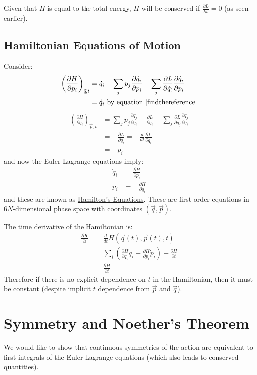 \documentclass[../Main.tex]{subfiles}
\begin{document}
Given that $H$ is equal to the total energy, $H$ will be conserved if $\frac{\partial L}{\partial t} = 0$ (as seen earlier).
\subsection{Hamiltonian Equations of Motion}
Consider:
\begin{align*}
    \left(\frac{\partial H}{\partial p_i}\right)_{\vec{q}, t} &= \dot{q}_i + \sum_j p_j \frac{\partial \dot{q}_i}{\partial p_i} - \sum_j \frac{\partial L}{\partial \dot{q}_i} \frac{\partial \dot{q}_i}{\partial p_i} \\
    &= \dot{q}_i \text{ by equation~\ref{findthereference}}
\end{align*}
\begin{align*}
    \left(\frac{\partial H}{\partial q_i}\right)_{\vec{p}, t} &= \sum_j p_j \frac{\partial \dot{q}_j}{\partial q_i} - \frac{\partial L}{\partial q_i} - \sum_j \frac{\partial L}{\partial \dot{q}_j} \frac{\partial \dot{q_j}}{\partial q_i} \\
    &= -\frac{\partial L}{\partial q_i} = -\frac{d}{dt} \frac{\partial L}{\partial q_i} \\
    &= -\dot{p}_i
\end{align*}
and now the Euler-Lagrange equations imply:
\begin{align}
    \dot{q}_i &= \frac{\partial H}{\partial p_i} \label{eqnHamilton1} \\
    \dot{p}_i &= -\frac{\partial H}{\partial q_i} \label{eqnHamilton2}
\end{align}
and these are known as \underline{Hamilton's Equations}. These are first-order equations in $6N$-dimensional phase space with coordinates $(\vec{q}, \vec{p})$.


The time derivative of the Hamiltonian is:
\begin{align*}
    \frac{\partial H}{\partial t} &= \frac{d}{dt} H(\vec{q}(t), \vec{p}(t), t) \\
    &= \sum_i \left(\frac{\partial H}{\partial q_i} \dot{q}_i + \frac{\partial H}{\partial p_i} \dot{p}_i\right) + \frac{\partial H}{\partial t} \\
    &= \frac{\partial H}{\partial t}
\end{align*}
Therefore if there is no explicit dependence on $t$ in the Hamiltonian, then it must be constant (despite implicit $t$ dependence from $\vec{p}$ and $\vec{q}$).
\section{Symmetry and Noether's Theorem}
We would like to show that continuous symmetries of the action are equivalent to first-integrals of the Euler-Lagrange equations (which also leads to conserved quantities).
\end{document}
